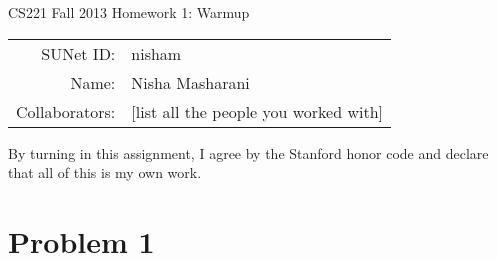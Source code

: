 \documentclass[12pt]{article}
\begin{document}
\begin{center}
{\Large CS221 Fall 2013 Homework 1: Warmup}

\begin{tabular}{rl}
SUNet ID: & nisham \\
Name: & Nisha Masharani \\
Collaborators: & [list all the people you worked with]
\end{tabular}
\end{center}

By turning in this assignment, I agree by the Stanford honor code and declare
that all of this is my own work.

\section*{Problem 1}
\end{document}
